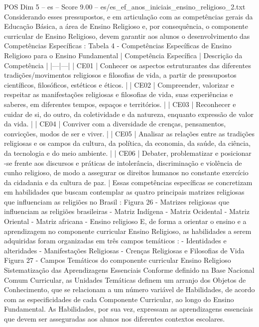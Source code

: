 \begin{textsample}{POS Dim 5 – es – Score 9.00 – es/es\_ef\_anos\_iniciais\_ensino\_religioso\_2.txt}  \label{ex:f5_pos_108}
Considerando esses pressupostos, e em articulação com as competências gerais da Educação Básica, a área de Ensino Religioso e, por consequência, o componente curricular de Ensino Religioso, devem garantir aos alunos o desenvolvimento das Competências Específicas : Tabela 4 - Competências Específicas de Ensino Religioso para o Ensino Fundamental | Competência Específica | Descrição da Competência | |---|---| | CE01 | Conhecer os aspectos estruturantes das diferentes tradições/movimentos religiosos e filosofias de vida, a partir de pressupostos científicos, filosóficos, estéticos e éticos. | | CE02 | Compreender, valorizar e respeitar as manifestações religiosas e filosofias de vida, suas experiências e saberes, em diferentes tempos, espaços e territórios. | | CE03 | Reconhecer e cuidar de si, do outro, da coletividade e da natureza, enquanto expressão de valor da vida. | | CE04 | Conviver com a diversidade de crenças, pensamentos, convicções, modos de ser e viver. | | CE05 | Analisar as relações entre as tradições religiosas e os campos da cultura, da política, da economia, da saúde, da ciência, da tecnologia e do meio ambiente. | | CE06 | Debater, problematizar e posicionar -se frente aos discursos e práticas de intolerância, discriminação e violência de cunho religioso, de modo a assegurar os direitos humanos no constante exercício da cidadania e da cultura de paz. | Essas competências específicas se concretizam em habilidades que buscam contemplar as quatro principais matrizes religiosas que influenciam as religiões no Brasil : Figura 26 - Matrizes religiosas que influenciam as religiões brasileiras - Matriz Indígena - Matriz Ocidental - Matriz Oriental - Matriz africana - Ensino religioso E, de forma a orientar o ensino e a aprendizagem no componente curricular Ensino Religioso, as habilidades a serem adquiridas foram organizadas em três campos temáticos : - Identidades e alteridades - Manifestações Religiosas - Crenças Religiosas e Filosofias de Vida Figura 27 - Campos Temáticos do componente curricular Ensino Religioso Sistematização das Aprendizagens Essenciais Conforme definido na Base Nacional Comum Curricular, as Unidades Temáticas definem um arranjo dos Objetos de Conhecimento, que se relacionam a um número variável de Habilidades, de acordo com as especificidades de cada Componente Curricular, ao longo do Ensino Fundamental.
As Habilidades, por sua vez, expressam as aprendizagens essenciais que devem ser asseguradas aos alunos nos diferentes contextos escolares.

\end{textsample}
